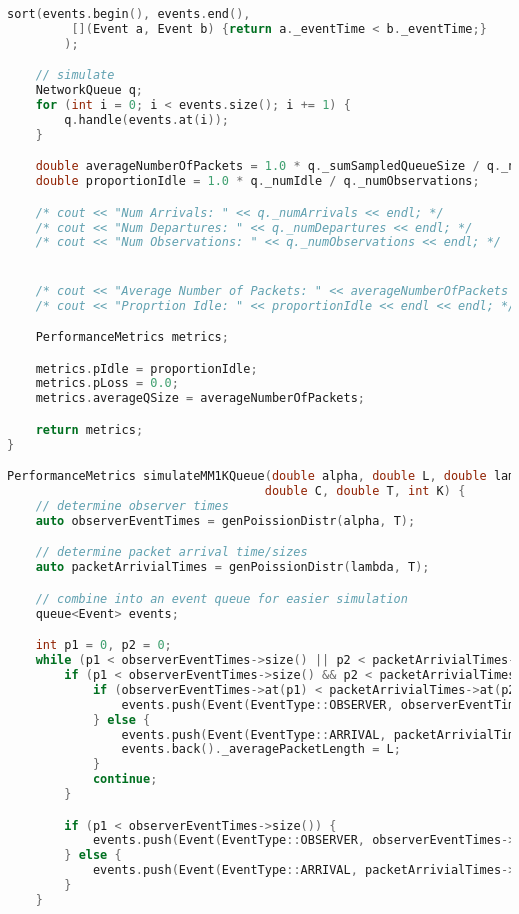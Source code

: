 \documentclass{article}
\begin{document}
\begin{lstlisting}[language=C++,
                   directivestyle={\color{black}}
                   emph={int,char,double,float,unsigned},
                   emphstyle={\color{blue}}
                  ]
    sort(events.begin(), events.end(),
         [](Event a, Event b) {return a._eventTime < b._eventTime;}
        );

    // simulate
    NetworkQueue q;
    for (int i = 0; i < events.size(); i += 1) {
        q.handle(events.at(i));
    }

    double averageNumberOfPackets = 1.0 * q._sumSampledQueueSize / q._numObservations;
    double proportionIdle = 1.0 * q._numIdle / q._numObservations;

    /* cout << "Num Arrivals: " << q._numArrivals << endl; */
    /* cout << "Num Departures: " << q._numDepartures << endl; */
    /* cout << "Num Observations: " << q._numObservations << endl; */


    /* cout << "Average Number of Packets: " << averageNumberOfPackets << endl; */
    /* cout << "Proprtion Idle: " << proportionIdle << endl << endl; */

    PerformanceMetrics metrics;

    metrics.pIdle = proportionIdle;
    metrics.pLoss = 0.0;
    metrics.averageQSize = averageNumberOfPackets;

    return metrics;
}

PerformanceMetrics simulateMM1KQueue(double alpha, double L, double lambda,
                                    double C, double T, int K) {
    // determine observer times
    auto observerEventTimes = genPoissionDistr(alpha, T);

    // determine packet arrival time/sizes
    auto packetArrivialTimes = genPoissionDistr(lambda, T);

    // combine into an event queue for easier simulation
    queue<Event> events;

    int p1 = 0, p2 = 0;
    while (p1 < observerEventTimes->size() || p2 < packetArrivialTimes->size()) {
        if (p1 < observerEventTimes->size() && p2 < packetArrivialTimes->size()) {
            if (observerEventTimes->at(p1) < packetArrivialTimes->at(p2)) {
                events.push(Event(EventType::OBSERVER, observerEventTimes->at(p1++)));
            } else {
                events.push(Event(EventType::ARRIVAL, packetArrivialTimes->at(p2++)));
                events.back()._averagePacketLength = L;
            }
            continue;
        }

        if (p1 < observerEventTimes->size()) {
            events.push(Event(EventType::OBSERVER, observerEventTimes->at(p1++)));
        } else {
            events.push(Event(EventType::ARRIVAL, packetArrivialTimes->at(p2++)));
        }
    }


\end{lstlisting}
\end{document}
